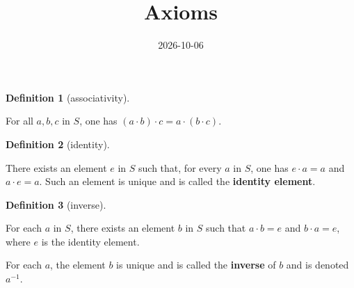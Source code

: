 \documentclass[
  british,
]{article}
\title{Axioms}
\author{}
\date{2026-10-06}
\theoremstyle{definition}
\newtheorem{definition}{Definition}[section]
\theoremstyle{remark}
\newcommand{\Identity}{{e}}
\newcommand{\Inverse}[1]{{#1}^{-1}}
\newcommand{\Operation}[2]{{#1}\cdot{#2}}
\newcommand{\Set}{{S}}
\begin{document}
\maketitle


\begin{definition}[associativity]\protect\hypertarget{def-associativity}{}\label{def-associativity}

For all \({a},{b},{c}\) in \(\Set\), one has
\(\Operation{(\Operation{a}{b})}{c}=\Operation{a}{(\Operation{b}{c})}\).

\end{definition}

\begin{definition}[identity]\protect\hypertarget{def-identity}{}\label{def-identity}

There exists an element \(\Identity\) in \(\Set\) such that, for every
\({a}\) in \(\Set\), one has \(\Operation{\Identity}{a}={a}\) and
\(\Operation{a}{\Identity}={a}\). Such an element is unique and is
called the \textbf{identity element}.

\end{definition}

\begin{definition}[inverse]\protect\hypertarget{def-Inverse}{}\label{def-Inverse}

For each \({a}\) in \(\Set\), there exists an element \({b}\) in
\(\Set\) such that \(\Operation{a}{b}=\Identity\) and
\(\Operation{b}{a}=\Identity\), where \(\Identity\) is the identity
element.

For each \({a}\), the element \({b}\) is unique and is called the
\textbf{inverse} of \({b}\) and is denoted \(\Inverse{a}\).

\end{definition}
\end{document}
